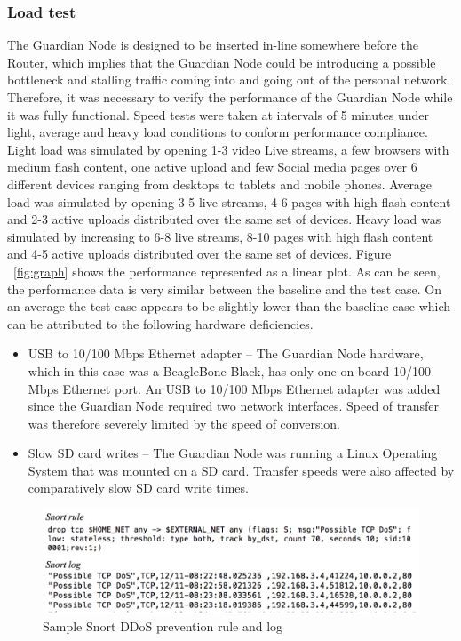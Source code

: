 \subsubsection{Load test}
\label{sec:eval:loadtest}
The Guardian Node is designed to be inserted in-line somewhere before the Router, which implies that the Guardian Node could be introducing a possible bottleneck and stalling traffic coming into and going out of the personal network. Therefore, it was necessary to verify the performance of the Guardian Node while it was fully functional. Speed tests were taken at intervals of 5 minutes under light, average and heavy load conditions to conform performance compliance. Light load was simulated by opening 1-3 video Live streams, a few browsers with medium flash content, one active upload and few Social media pages over 6 different devices ranging from desktops to tablets and mobile phones. Average load was simulated by opening 3-5 live streams, 4-6 pages with high flash content and 2-3 active uploads distributed over the same set of devices. Heavy load was simulated by increasing to 6-8 live streams, 8-10 pages with high flash content and 4-5 active uploads distributed over the same set of devices. Figure ~\ref{fig:graph} shows the performance represented as a linear plot. As can be seen, the performance data is very similar between the baseline and the test case. On an average the test case appears to be slightly lower than the baseline case which can be attributed to the following hardware deficiencies.
\begin{itemize}
    \item USB to 10/100 Mbps Ethernet adapter --
    The Guardian Node hardware, which in this case was a BeagleBone Black, has only one on-board 10/100 Mbps Ethernet port. An USB to 10/100 Mbps Ethernet adapter was added since the Guardian Node required two network interfaces. Speed of transfer was therefore severely limited by the speed of conversion.
    \item Slow SD card writes --
    The Guardian Node was running a Linux Operating System that was mounted on a SD card. Transfer speeds were also affected by comparatively slow SD card write times.
\end{itemize}


\begin{figure}
	\centering
	\includegraphics[width=\columnwidth]{figs/ddosrule.png}
	\caption{Sample Snort DDoS prevention rule and log}
	\label{fig:snortrule1}
\end{figure}

